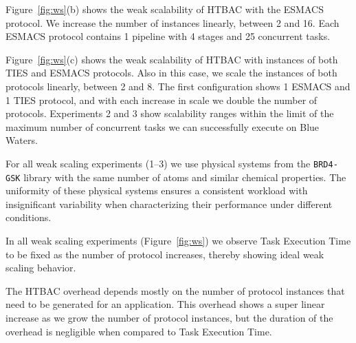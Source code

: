 Figure~\ref{fig:ws}(b) shows the weak scalability of HTBAC with the ESMACS
protocol. We increase the number of instances
linearly, between 2 and 16. Each ESMACS protocol contains 1 pipeline with 4
stages and 25 concurrent tasks.

Figure~\ref{fig:ws}(c) shows the weak scalability of HTBAC with instances of
both TIES and ESMACS protocols. Also in this case, we scale the instances of
both protocols linearly, between 2 and 8. The first configuration shows 1
ESMACS and 1 TIES protocol, and with each increase in scale we double the
number of protocols. Experiments 2 and 3 show scalability ranges within the
limit of the maximum number of concurrent tasks we can successfully execute
on Blue Waters. 

For all weak scaling experiments (1--3) we use physical systems from the
\texttt{BRD4-GSK} library with the same number of atoms and similar chemical
properties. The uniformity of these physical systems ensures a consistent
workload with insignificant variability when characterizing their performance
under different conditions.



In all weak scaling experiments (Figure~\ref{fig:ws}) we observe
 Task Execution Time to be fixed as the number of protocol
increases, thereby showing ideal weak scaling behavior. 

The HTBAC overhead depends mostly on the number of protocol instances that
need to be generated for an application. This overhead shows a super linear
increase as we grow the number of protocol instances, but the duration of the
overhead is negligible when compared to  Task Execution Time.


